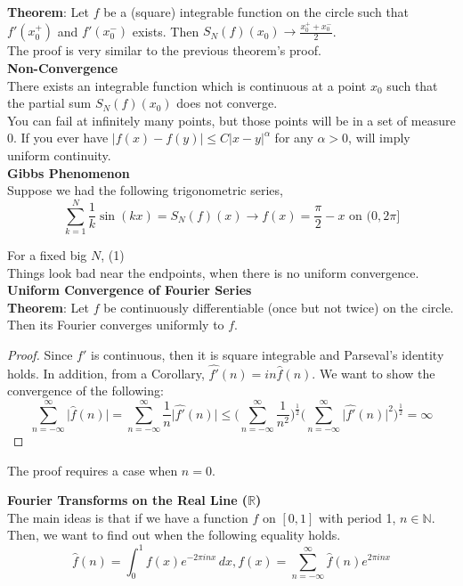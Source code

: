\documentclass[12pt]{article}
\begin{document}
\noindent \textbf{Theorem}: Let $f$ be a (square) integrable function on the circle such that $f'(x_0^+)$ and $f'(x_0^-)$ exists. Then $S_N(f)(x_0) \rightarrow \frac{x_0^+ + x_0^-}{2}$. \\

\noindent The proof is very similar to the previous theorem's proof. \\

\noindent \textbf{Non-Convergence} \\
\noindent There exists an integrable function which is continuous at a point $x_0$ such that the partial sum $S_N(f)(x_0)$ does not converge. \\

\noindent You can fail at infinitely many points, but those points will be in a set of measure 0. If you ever have $\vert f(x)-f(y)\vert \leq C \vert x-y \vert^\alpha$ for any $\alpha>0$, will imply uniform continuity. \\

\noindent \textbf{Gibbs Phenomenon} \\
\noindent Suppose we had the following trigonometric series, 
$$ \sum^N_{k=1} \frac{1}{k} \sin(kx) = S_N(f)(x) \rightarrow f(x) = \frac{\pi}{2} -x \text{ on } (0, 2\pi]$$

\noindent For a fixed big $N$, (1) \\

\noindent Things look bad near the endpoints, when there is no uniform convergence. \\

\noindent \textbf{Uniform Convergence of Fourier Series} \\
\noindent \textbf{Theorem}: Let $f$ be continuously differentiable (once but not twice) on the circle. Then its Fourier converges uniformly to $f$.
\begin{proof}
Since $f'$ is continuous, then it is square integrable and Parseval's identity holds. In addition, from a Corollary, $\widehat{f'}(n) = in\hat{f}(n)$. We want to show the convergence of the following:
$$\sum^\infty_{n=-\infty} \vert \hat{f}(n) \vert = \sum^\infty_{n=-\infty} \frac{1}{n} \vert \widehat{f'}(n) \vert \leq \Big(\sum^\infty_{n=-\infty} \frac{1}{n^2}\Big)^{\frac{1}{2}}\Big(\sum^\infty_{n=-\infty} \vert \widehat{f'}(n) \vert^2 \Big)^{\frac{1}{2}}= \infty$$
\end{proof}
\noindent The proof requires a case when $n=0$. 

\noindent \textbf{Fourier Transforms on the Real Line ($\mathbb{R}$)} \\
\noindent The main ideas is that if we have a function $f$ on $[0,1]$ with period 1, $n \in \mathbb{N}$. Then, we want to find out when the following equality holds.
$$\hat{f}(n) = \int^1_0 f(x)e^{-2\pi inx} \, dx, f(x) = \sum^\infty_{n=-\infty} \hat{f}(n) e^{2\pi i nx}$$
\end{document}

